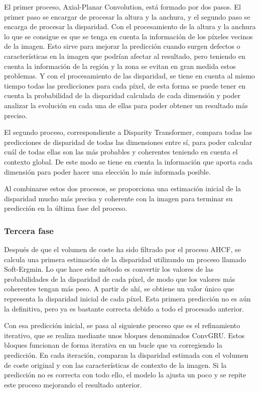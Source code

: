El primer proceso, Axial-Planar Convolution, está formado por dos pasos. El primer paso se encargar de procesar la altura y la anchura, y el segundo paso se encarga de procesar la disparidad. Con el procesamiento de la altura y la anchura lo que se consigue es que se tenga en cuenta la información de los píxeles vecinos de la imagen. Esto sirve para mejorar la predicción cuando surgen defectos o características en la imagen que podrían afectar al resultado, pero teniendo en cuenta la información de la región y la zona se evitan en gran medida estos problemas. Y con el procesamiento de las disparidad, se tiene en cuenta al mismo tiempo todas las predicciones para cada píxel, de esta forma se puede tener en cuenta la probabilidad de la disparidad calculada de cada dimensión y poder analizar la evolución en cada una de ellas para poder obtener un resultado más preciso.

El segundo proceso, correspondiente a Disparity Transformer, compara todas las predicciones de disparidad de todas las dimensiones entre sí, para poder calcular cuál de todas ellas son las más probables y coherentes teniendo en cuenta el contexto global. De este modo se tiene en cuenta la información que aporta cada dimensión para poder hacer una elección lo más informada posible.

Al combinarse estos dos procesos, se proporciona una estimación inicial de la disparidad mucho más precisa y coherente con la imagen para terminar su predicción en la última fase del proceso. 

\subsubsection{Tercera fase}
Después de que el volumen de coste ha sido filtrado por el proceso AHCF, se calcula una primera estimación de la disparidad utilizando un proceso llamado Soft-Ergmin. Lo que hace este método es convertir los valores de las probabilidades de la disparidad de cada píxel, de modo que los valores más coherentes tengan más peso. A partir de ahí, se obtiene un valor único que representa la disparidad inicial de cada píxel. Esta primera predicción no es aún la definitiva, pero ya es bastante correcta debido a todo el procesado anterior.

Con esa predicción inicial, se pasa al siguiente proceso que es el refinamiento iterativo, que se realiza mediante unos bloques denominados ConvGRU. Estos bloques funcionan  de forma iterativa en un bucle que va corregiendo la predicción. En cada iteración, comparan la disparidad estimada con el volumen de coste original y con las características de contexto de la imagen. Si la predicción no es correcta con todo ello, el modelo la ajusta un poco y se repite este proceso mejorando el resultado anterior.

